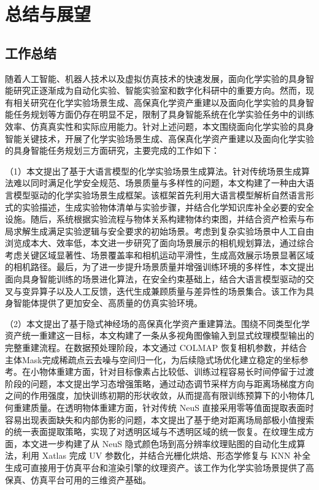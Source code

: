 \chapter{总结与展望}
\label{chap:conclusion}

\section{工作总结}

随着人工智能、机器人技术以及虚拟仿真技术的快速发展，面向化学实验的具身智能研究正逐渐成为自动化实验、智能实验室和数字化科研中的重要方向。然而，现有相关研究在化学实验场景生成、高保真化学资产重建以及面向化学实验的具身智能任务规划等方面仍存在明显不足，限制了具身智能系统在化学实验任务中的训练效率、仿真真实性和实际应用能力。针对上述问题，本文围绕面向化学实验的具身智能关键技术，开展了化学实验场景生成、高保真化学资产重建以及面向化学实验的具身智能任务规划三方面研究，主要完成的工作如下：

（1）本文提出了基于大语言模型的化学实验场景生成算法。针对传统场景生成算法难以同时满足化学安全规范、场景质量与多样性的问题，本文构建了一种由大语言模型驱动的化学实验场景生成框架。该框架首先利用大语言模型解析自然语言形式的实验描述，生成实验物体清单与实验步骤，并结合化学知识库补全必要的安全设施。随后，系统根据实验流程与物体关系构建物体约束图，并结合资产检索与布局求解生成满足实验逻辑与安全要求的初始场景。考虑到复杂实验场景中人工自由浏览成本大、效率低，本文进一步研究了面向场景展示的相机规划算法，通过综合考虑关键区域显著性、场景覆盖率和相机运动平滑性，生成高效展示场景显著区域的相机路径。最后，为了进一步提升场景质量并增强训练环境的多样性，本文提出面向具身智能训练的场景进化算法，在安全约束基础上，结合大语言模型驱动的交叉与变异算子以及人工反馈，迭代生成兼顾质量与差异性的场景集合。该工作为具身智能体提供了更加安全、高质量的仿真实验环境。

（2）本文提出了基于隐式神经场的高保真化学资产重建算法。围绕不同类型化学资产统一重建这一目标，本文构建了一条从多视角图像输入到显式纹理模型输出的完整重建流程。在数据预处理阶段，本文通过 COLMAP 恢复相机参数，并结合主体Mask完成稀疏点云去噪与空间归一化，为后续隐式场优化建立稳定的坐标参考。在小物体重建方面，针对目标像素占比较低、训练过程容易长时间停留于过渡阶段的问题，本文提出学习态增强策略，通过动态调节采样方向与距离场梯度方向之间的作用强度，加快训练初期的形状收敛，从而提高有限训练预算下的小物体几何重建质量。在透明物体重建方面，针对传统 NeuS 直接采用零等值面提取表面时容易出现表面缺失和内部伪影的问题，本文提出了基于绝对距离场局部极小值搜索的统一表面提取策略，实现了对透明区域与不透明区域的统一恢复。在纹理生成方面，本文进一步构建了从 NeuS 隐式颜色场到高分辨率纹理贴图的自动化生成算法，利用 Xatlas 完成 UV 参数化，并结合光栅化烘焙、形态学修复与 KNN 补全生成可直接用于仿真平台和渲染引擎的纹理资产。该工作为化学实验场景提供了高保真、仿真平台可用的三维资产基础。


